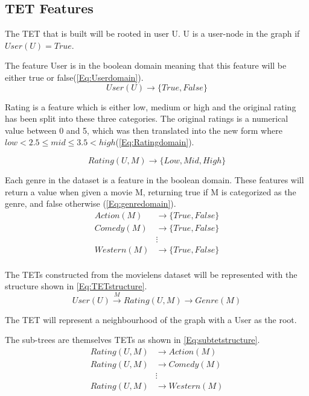 \subsection{TET Features}
The TET that is built will be rooted in user U.
U is a user-node in the graph if $User(U) = True$. 

The feature User is in the boolean domain meaning that this feature will be either true or false(\autoref{Eq:Userdomain}).
\begin{equation}\label{Eq:Userdomain}
User(U)\rightarrow \{True, False\}
\end{equation}

Rating is a feature which is either low, medium or high and the original rating has been split into these three categories.
The original ratings is a numerical value between 0 and 5, which was then translated into the new form where $low<2.5\leq mid \leq 3.5<high$(\autoref{Eq:Ratingdomain}).

\begin{equation}\label{Eq:Ratingdomain}
Rating(U, M) \rightarrow \{Low, Mid, High\}
\end{equation}

Each genre in the dataset is a feature in the boolean domain. These features will return a value when given a movie M, returning true if M is categorized as the genre, and false otherwise (\autoref{Eq:genredomain}).
\begin{equation}\label{Eq:genredomain}
\begin{aligned}
Action(M)& \rightarrow \{True, False\} \\
Comedy(M)& \rightarrow \{True, False\} \\
&\vdots \\
Western(M)& \rightarrow \{True, False\} \\
\end{aligned}
\end{equation}

The TETs constructed from the movielens dataset will be represented with the structure shown in \autoref{Eq:TETstructure}.
\begin{equation}\label{Eq:TETstructure}
User(U) \stackrel{M}{\longrightarrow} Rating(U,M) \longrightarrow Genre(M)
\end{equation}

The TET will represent a neighbourhood of the graph with a User as the root.

The sub-trees are themselves TETs as shown in \autoref{Eq:subtetstructure}.
\begin{equation}\label{Eq:subtetstructure}
\begin{aligned}
Rating(U,M)& \longrightarrow Action(M) \\
Rating(U,M)& \longrightarrow Comedy(M)\\
& \vdots \\
Rating(U,M)& \longrightarrow Western(M)
\end{aligned}	
\end{equation}

